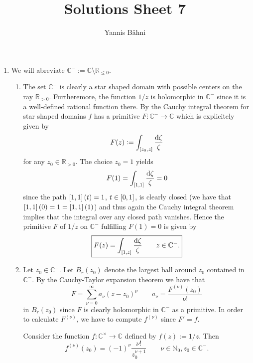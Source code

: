 

\title{Solutions Sheet 7}
\author{Yannis B\"{a}hni}
\address[Yannis B\"{a}hni]{University of Zurich, R\"{a}mistrasse 71, 8006 Zurich}


\maketitle
\thispagestyle{fancy}
\begin{enumerate}[label = \textbf{Exercise \arabic*.},wide = 0pt, itemsep=1.5ex]
	\item
		We will abreviate $\mathbb{C}^- := \mathbb{C} \setminus \mathbb{R}_{\leq 0}$.
		\begin{enumerate}[label = (\alph*),wide = 0pt, itemsep=1.5ex]
			\item The set $\mathbb{C}^-$ is clearly a star shaped domain with possible centers on the ray $\mathbb{R}_{>0}$. Furtheremore, the function $1/z$ is holomorphic in $\mathbb{C}^-$ since it is a well-defined rational function there. By the Cauchy integral theorem for star shaped domains $f$ has a primitive $F: \mathbb{C}^- \to \mathbb{C}$ which is explicitely given by 
				\begin{equation}
					F(z) := \int_{\intcc{z_0,z}} \frac{\d\zeta}{\zeta}
				\end{equation}
				\noindent for any $z_0 \in \mathbb{R}_{>0}$. The choice $z_0 = 1$ yields
				\begin{equation}
					F(1) = \int_{\intcc{1,1}} \frac{\d\zeta}{\zeta} = 0
				\end{equation}
				\noindent since the path $\intcc{1,1}(t) = 1$, $t \in \intcc{0,1}$, is clearly closed (we have that $\intcc{1,1}(0) = 1 = \intcc{1,1}(1)$) and thus again the Cauchy integral theorem implies that the integral over any closed path vanishes. Hence the primitive $F$ of $1/z$ on $\mathbb{C}^-$ fulfilling $F(1) = 0$ is given by 
				\begin{equation}
					\boxed{F(z) = \int_{\intcc{1,z}} \frac{\d\zeta}{\zeta} \qquad z \in \mathbb{C}^-.}
				\end{equation}
			\item Let $z_0 \in \mathbb{C}^-$. Let $B_r(z_0)$ denote the largest ball around $z_0$ contained in $\mathbb{C}^-$. By the Cauchy-Taylor expansion theorem we have that 
				\begin{equation}
					F = \sum_{\nu = 0}^\infty a_\nu (z - z_0)^\nu \qquad a_\nu = \frac{F^{(\nu)}(z_0)}{\nu !}
				\end{equation}
				\noindent in $B_r(z_0)$ since $F$ is clearly holomorphic in $\mathbb{C}^-$ as a primitive. In order to calculate $F^{(\nu)}$, we have to compute $f^{(\nu)}$ since $F' = f$.
				\begin{lemma}
					Consider the function $f: \mathbb{C}^\times \to \mathbb{C}$ defined by $f(z) := 1/z$. Then
					\begin{equation}
						f^{(\nu)}(z_0) = (-1)^{\nu}\frac{\nu !}{z^{\nu + 1}_0} \qquad \nu \in \mathbb{N}_0, z_0 \in \mathbb{C}^-.
					\end{equation}
					\label{lem:derf}
				\end{lemma}


\end{enumerate}
\end{enumerate}
